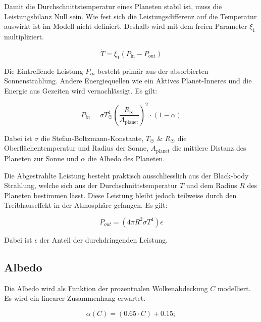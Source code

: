 \begin{refsection}
Damit die Durchschnittstemperatur eines Planeten stabil ist, muss die Leistungsbilanz Null sein. Wie fest sich die Leistungsdifferenz auf die Temperatur auswirkt ist im Modell nicht definiert. Deshalb wird mit dem freien Parameter $\xi_1$ multipliziert. 

\begin{equation}
\dot{T} = \xi_1(P_{\text{in}} - P_{\text{out}})
\end{equation}

Die Eintreffende Leistung $P_{in}$ besteht primär aus der absorbierten Sonnenstrahlung. Andere Energiequellen wie ein Aktives Planet-Inneres und die Energie aus Gezeiten wird vernachlässigt. Es gilt:


\begin{equation}
P_{in} = \sigma T_{\astrosun}^4 \left( \frac{R_{\astrosun}}{A_{\text{planet}}} \right) ^2 \cdot (1-\alpha)
\end{equation}

Dabei ist $\sigma$ die Stefan-Boltzmann-Konstante, $T_{\astrosun}$ \& $R_{\astrosun}$ die Oberflächentemperatur und Radius der Sonne, $ A_{\text{planet}}$ die mittlere Distanz des Planeten zur Sonne und $\alpha$ die Albedo des Planeten.

Die Abgestrahlte Leistung besteht praktisch ausschliesslich aus der Black-body Strahlung, welche sich aus der Durchschnittstemperatur $T$ und dem Radius $R$ des Planeten bestimmen lässt. Diese Leistung bleibt jedoch teilweise durch den Treibhauseffekt in der Atmosphäre gefangen. Es gilt: 

\begin{equation}
P_{out} = (4 \pi R^2 \sigma T^4) \epsilon
\end{equation}

Dabei ist $\epsilon$ der Anteil der durchdringenden Leistung.

\subsection{Albedo}

Die Albedo wird als Funktion der prozentualen Wolkenabdeckung $C$ modelliert. Es wird ein linearer Zusammenhang erwartet.

\begin{equation}
\alpha(C) = (0.65 \cdot C) + 0.15;
\end{equation}



\end{refsection}
